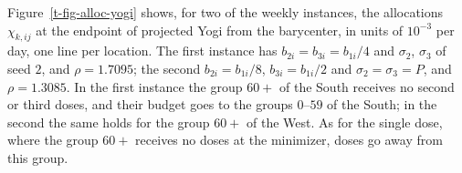 \documentclass[11pt]{article}
\theoremstyle{plain}
\theoremstyle{remark}
\numberwithin{equation}{section}
\begin{document}
Figure~\ref{t-fig-alloc-yogi} shows, for two of the
weekly instances, the allocations $\chi_{k,ij}$ at the endpoint of projected
Yogi from the barycenter, in units of $10^{-3}$ per day, one line per
location. The first instance has $b_{2i}=b_{3i}=b_{1i}/4$ and $\sigma_2$,
$\sigma_3$ of seed $2$, and $\rho=1.7095$; the second $b_{2i}=b_{1i}/8$,
$b_{3i}=b_{1i}/2$ and $\sigma_2=\sigma_3=P$, and $\rho=1.3085$. In the first
instance the group $60+$ of the South receives no second or third doses, and
their budget goes to the groups $0$--$59$ of the South; in the second the same
holds for the group $60+$ of the West. As for the single dose, where the group
$60+$ receives no doses at the minimizer, doses go away from this group.

\end{document}
